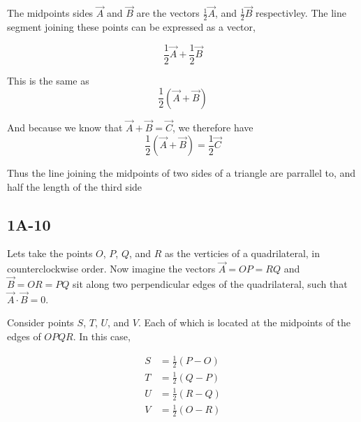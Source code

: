 The midpoints sides $\vec{A}$ and $\vec{B}$ are the vectors 
$\frac{1}{2}\vec{A}$, and $\frac{1}{2}\vec{B}$ respectivley.
The line segment joining these points can be expressed as a vector, 

\begin{equation*}
\frac{1}{2}\vec{A} + \frac{1}{2}\vec{B}
\end{equation*}

This is the same as 
\begin{equation*}
\frac{1}{2} (\vec{A} + \vec{B})
\end{equation*}

And because we know that $\vec{A} + \vec{B} = \vec{C}$, we therefore 
have 
\begin{equation*}
\frac{1}{2} (\vec{A} + \vec{B}) =  \frac{1}{2} \vec{C}
\end{equation*}


Thus the line joining the midpoints of two sides of a triangle are 
parrallel to, and half the length of the third side


\subsection*{1A-10}

Lets take the points $O$, $P$, $Q$, and $R$ as the verticies of a 
quadrilateral, in counterclockwise order. Now imagine the vectors $
\vec{A} = OP = RQ $ and $\vec{B} = OR = PQ$ sit along two 
perpendicular edges of the quadrilateral, such that $\vec{A} \cdot 
\vec{B} = 0$.




Consider points $S$, $T$, $U$, and $V$. Each of which is located at 
the midpoints of the edges of $OPQR$. In this case, 

\begin{align*}
S &= \frac{1}{2} (P - O)\\
T &= \frac{1}{2} (Q - P) \\
U &= \frac{1}{2} (R - Q) \\
V &= \frac{1}{2} (O - R)
\end{align*}
